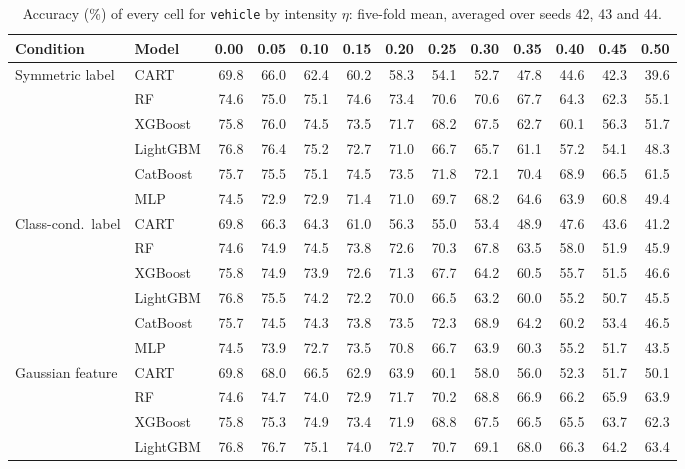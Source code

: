 \documentclass[pdflatex,sn-mathphys]{sn-jnl}
\theoremstyle{thmstyleone}
\begin{document}
\begin{table}[htbp]
\centering
\tiny
\setlength{\tabcolsep}{2.6pt}
\caption{Accuracy (\%) of every cell for \texttt{vehicle} by intensity $\eta$: five-fold mean, averaged over seeds 42, 43 and 44.}
\label{tab:grid_vehicle}
\begin{tabular}{@{}llrrrrrrrrrrr@{}}
\toprule
Condition & Model & 0.00 & 0.05 & 0.10 & 0.15 & 0.20 & 0.25 & 0.30 & 0.35 & 0.40 & 0.45 & 0.50 \\
\midrule
Symmetric label & CART & 69.8 & 66.0 & 62.4 & 60.2 & 58.3 & 54.1 & 52.7 & 47.8 & 44.6 & 42.3 & 39.6 \\
 & RF & 74.6 & 75.0 & 75.1 & 74.6 & 73.4 & 70.6 & 70.6 & 67.7 & 64.3 & 62.3 & 55.1 \\
 & XGBoost & 75.8 & 76.0 & 74.5 & 73.5 & 71.7 & 68.2 & 67.5 & 62.7 & 60.1 & 56.3 & 51.7 \\
 & LightGBM & 76.8 & 76.4 & 75.2 & 72.7 & 71.0 & 66.7 & 65.7 & 61.1 & 57.2 & 54.1 & 48.3 \\
 & CatBoost & 75.7 & 75.5 & 75.1 & 74.5 & 73.5 & 71.8 & 72.1 & 70.4 & 68.9 & 66.5 & 61.5 \\
 & MLP & 74.5 & 72.9 & 72.9 & 71.4 & 71.0 & 69.7 & 68.2 & 64.6 & 63.9 & 60.8 & 49.4 \\
\midrule
Class-cond.\ label & CART & 69.8 & 66.3 & 64.3 & 61.0 & 56.3 & 55.0 & 53.4 & 48.9 & 47.6 & 43.6 & 41.2 \\
 & RF & 74.6 & 74.9 & 74.5 & 73.8 & 72.6 & 70.3 & 67.8 & 63.5 & 58.0 & 51.9 & 45.9 \\
 & XGBoost & 75.8 & 74.9 & 73.9 & 72.6 & 71.3 & 67.7 & 64.2 & 60.5 & 55.7 & 51.5 & 46.6 \\
 & LightGBM & 76.8 & 75.5 & 74.2 & 72.2 & 70.0 & 66.5 & 63.2 & 60.0 & 55.2 & 50.7 & 45.5 \\
 & CatBoost & 75.7 & 74.5 & 74.3 & 73.8 & 73.5 & 72.3 & 68.9 & 64.2 & 60.2 & 53.4 & 46.5 \\
 & MLP & 74.5 & 73.9 & 72.7 & 73.5 & 70.8 & 66.7 & 63.9 & 60.3 & 55.2 & 51.7 & 43.5 \\
\midrule
Gaussian feature & CART & 69.8 & 68.0 & 66.5 & 62.9 & 63.9 & 60.1 & 58.0 & 56.0 & 52.3 & 51.7 & 50.1 \\
 & RF & 74.6 & 74.7 & 74.0 & 72.9 & 71.7 & 70.2 & 68.8 & 66.9 & 66.2 & 65.9 & 63.9 \\
 & XGBoost & 75.8 & 75.3 & 74.9 & 73.4 & 71.9 & 68.8 & 67.5 & 66.5 & 65.5 & 63.7 & 62.3 \\
 & LightGBM & 76.8 & 76.7 & 75.1 & 74.0 & 72.7 & 70.7 & 69.1 & 68.0 & 66.3 & 64.2 & 63.4 \\

\end{tabular}
\end{table}
\end{document}
